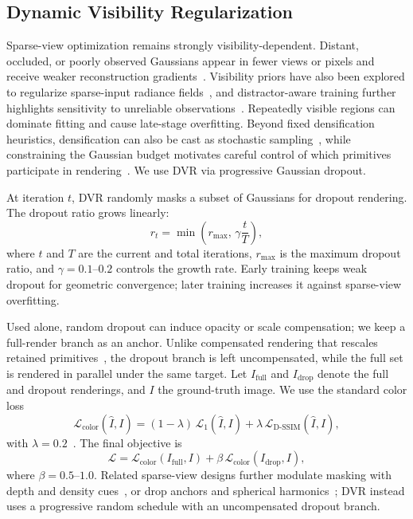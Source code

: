 \subsection{Dynamic Visibility Regularization}
\label{sec:dvr}

Sparse-view optimization remains strongly visibility-dependent. Distant, occluded, or poorly observed Gaussians appear in fewer views or pixels and receive weaker reconstruction gradients~\cite{Xu25_DropoutGS,Park25_DropGaussian}. Visibility priors have also been explored to regularize sparse-input radiance fields~\cite{Somraj23_ViPNeRF}, and distractor-aware training further highlights sensitivity to unreliable observations~\cite{Sabour24_SpotlessSplats}. Repeatedly visible regions can dominate fitting and cause late-stage overfitting. Beyond fixed densification heuristics, densification can also be cast as stochastic sampling~\cite{Kheradmand24_3DGSMCMC}, while constraining the Gaussian budget motivates careful control of which primitives participate in rendering~\cite{Fang24_MiniSplatting}. We use DVR via progressive Gaussian dropout.

At iteration $t$, DVR randomly masks a subset of Gaussians for dropout rendering. The dropout ratio grows linearly:
\begin{equation}
\label{eq:dropout_ratio}
r_t=\min\left(r_{\max},\,\gamma\frac{t}{T}\right),
\end{equation}
where $t$ and $T$ are the current and total iterations, $r_{\max}$ is the maximum dropout ratio, and $\gamma=0.1$--$0.2$ controls the growth rate. Early training keeps weak dropout for geometric convergence; later training increases it against sparse-view overfitting.

Used alone, random dropout can induce opacity or scale compensation; we keep a full-render branch as an anchor. Unlike compensated rendering that rescales retained primitives~\cite{Park25_DropGaussian}, the dropout branch is left uncompensated, while the full set is rendered in parallel under the same target. Let $I_{\mathrm{full}}$ and $I_{\mathrm{drop}}$ denote the full and dropout renderings, and $I$ the ground-truth image. We use the standard color loss
\begin{equation}
\label{eq:color_loss}
\mathcal{L}_{\mathrm{color}}(\hat{I},I)
=
(1-\lambda)\,\mathcal{L}_{1}(\hat{I},I)
+
\lambda\,\mathcal{L}_{\mathrm{D\text{-}SSIM}}(\hat{I},I),
\end{equation}
with $\lambda=0.2$~\cite{Kerbl23_3DGS}. The final objective is
\begin{equation}
\label{eq:dvr_loss}
\mathcal{L}
=
\mathcal{L}_{\mathrm{color}}(I_{\mathrm{full}},I)
+
\beta\,\mathcal{L}_{\mathrm{color}}(I_{\mathrm{drop}},I),
\end{equation}
where $\beta=0.5$--$1.0$. Related sparse-view designs further modulate masking with depth and density cues~\cite{Song26_D2GS}, or drop anchors and spherical harmonics~\cite{Fang26_DropAnSH}; DVR instead uses a progressive random schedule with an uncompensated dropout branch.
